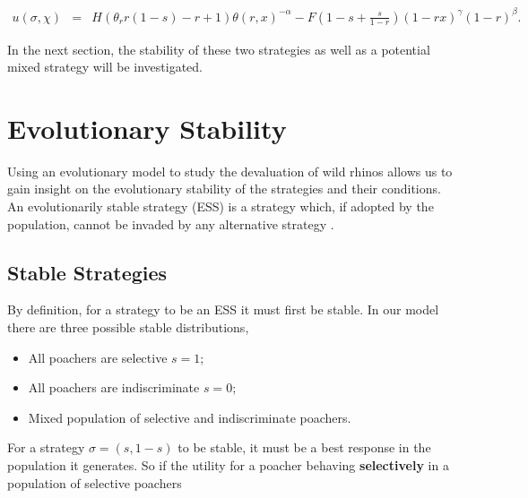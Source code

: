 \documentclass[10pt]{article}
\begin{document}
\begin{eqnarray}
\label{eqn:tutility2}
u(\sigma, \chi) &=&
H (\theta_r r(1-s) - r + 1)\theta(r,x)^{-\alpha} - F\left(1-s + \frac{s}{1-r} \right)(1-rx)^{\gamma}(1-r)^{\beta} .
\end{eqnarray}

In the next section, the stability of these two strategies as well as a potential 
mixed strategy will be investigated.

\section{Evolutionary Stability}\label{section:evolutionary_stability}

Using an evolutionary model to study the devaluation of wild rhinos allows us 
to gain insight on the evolutionary stability of the strategies and their conditions.
An evolutionarily stable strategy (ESS) is a strategy which, if adopted by the 
population, cannot be invaded by any alternative strategy 
\cite{nowak2006evolutionary}.

\subsection{Stable Strategies}\label{subsection:stable_strategies}

By definition, for a strategy to be an ESS it must first be stable.
In our model there are three possible stable distributions, 

\begin{itemize} 
	\item All poachers are selective \(s=1\);
	\item All poachers are indiscriminate \(s=0\);
	\item Mixed population of selective and indiscriminate poachers.
\end{itemize}

For a strategy \(\sigma=(s, 1- s)\) to be stable, it must be a best response in 
the population it generates.  So if the utility for a poacher behaving 
\textbf{selectively} in a population of selective poachers
\end{document}
